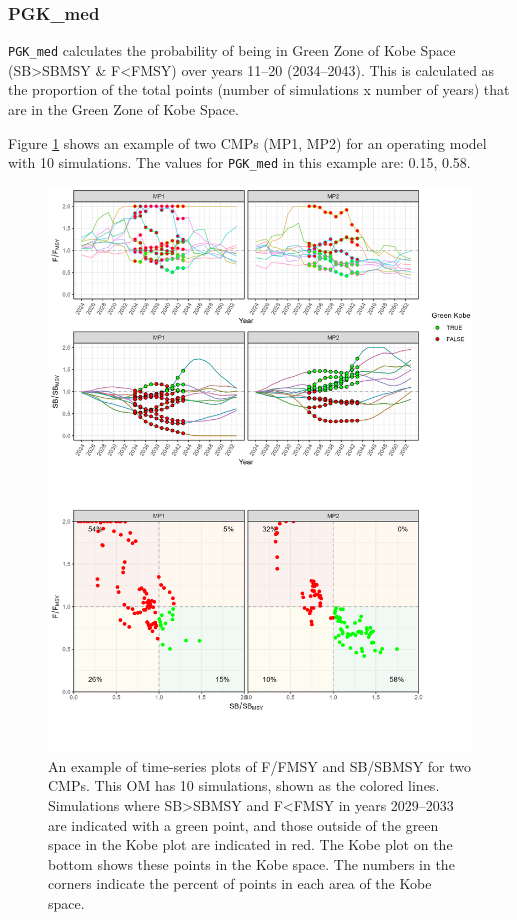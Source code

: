\documentclass[
]{article}
\begin{document}
\hypertarget{pgk_med}{%
\subsubsection{PGK\_med}\label{pgk_med}}

\texttt{PGK\_med} calculates the probability of being in Green Zone of Kobe Space (SB\textgreater SBMSY \& F\textless FMSY) over years 11--20 (2034--2043). This is calculated as the proportion of the total points (number of simulations x number of years) that are in the Green Zone of Kobe Space.

Figure \ref{fig:PGKmed} shows an example of two CMPs (MP1, MP2) for an operating model with 10 simulations. The values for \texttt{PGK\_med} in this example are: 0.15, 0.58.

\begin{figure}
\includegraphics[width=37.5in]{../../img/PMs/PGK_med} \caption{An example of time-series plots of F/FMSY and SB/SBMSY for two CMPs. This OM has 10 simulations, shown as the colored lines. Simulations where SB>SBMSY and F<FMSY in years 2029--2033 are indicated with a green point, and those outside of the green space in the Kobe plot are indicated in red. The Kobe plot on the bottom shows these points in the Kobe space. The numbers in the corners indicate the percent of points in each area of the Kobe space.}\label{fig:PGKmed}
\end{figure}
\end{document}
